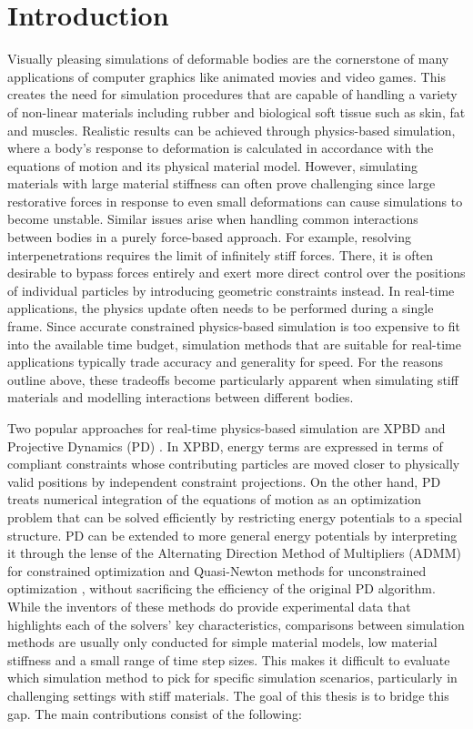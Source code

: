 \chapter{Introduction}\label{ch:introduction}
Visually pleasing simulations of deformable bodies are the cornerstone of many applications of computer graphics like animated movies and video games.
This creates the need for simulation procedures that are capable of handling a variety of non-linear materials including rubber and biological soft 
tissue such as skin, fat and muscles. Realistic results can be achieved through physics-based simulation, where a body's response to deformation is 
calculated in accordance with the equations of motion and its physical material model. However, simulating materials with large material stiffness 
can often prove challenging since large restorative forces in response to even small deformations can cause simulations to become unstable. Similar 
issues arise when handling common interactions between bodies in a purely force-based approach. For example, resolving interpenetrations requires 
the limit of infinitely stiff forces. There, it is often desirable to bypass forces entirely and exert more direct control over the positions of 
individual particles by introducing geometric constraints instead. In real-time applications, the physics update often needs to be performed during a 
single frame. Since accurate constrained physics-based simulation is too expensive to fit into the available time budget, simulation methods that are 
suitable for real-time applications typically trade accuracy and generality for speed. For the reasons outline above, these tradeoffs become particularly 
apparent when simulating stiff materials and modelling interactions between different bodies.

Two popular approaches for real-time physics-based simulation are XPBD \cite{macklin2016} and Projective Dynamics (PD) 
\cite{bouaziz2014}. In XPBD, energy terms are expressed in terms of compliant constraints whose contributing particles are moved closer to physically 
valid positions by independent constraint projections. On the other hand, PD treats numerical integration of the equations of motion as an optimization 
problem that can be solved efficiently by restricting energy potentials to a special structure. PD can be extended to more general energy potentials 
by interpreting it through the lense of the Alternating Direction Method of Multipliers (ADMM) for constrained optimization \cite{overby2017} and 
Quasi-Newton methods for unconstrained optimization \cite{liu2017}, without sacrificing the efficiency of the original PD algorithm. While the inventors 
of these methods do provide experimental data that highlights each of the solvers' key characteristics, comparisons between simulation methods are usually 
only conducted for simple material models, low material stiffness and a small range of time step sizes. This makes it difficult to evaluate which 
simulation method to pick for specific simulation scenarios, particularly in challenging settings with stiff materials.  The goal of this thesis is to 
bridge this gap. The main contributions consist of the following:

